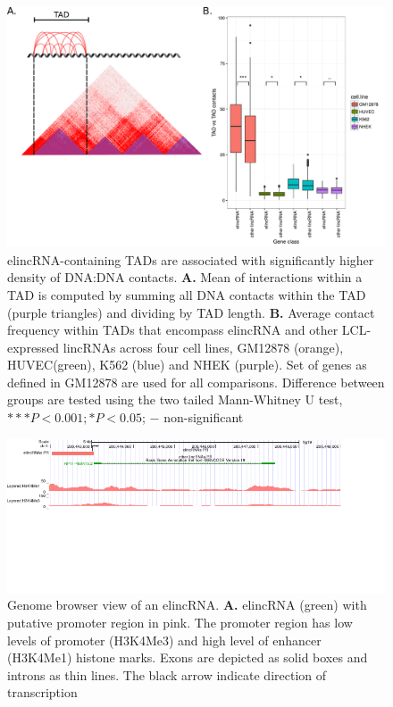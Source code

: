 \documentclass[11pt,a4paper]{report}
\begin{document}
\begin{figure}[ht]
	\includegraphics[width=1\textwidth]{Figures/5_TAD_TAD_contact.pdf}
	\caption{elincRNA-containing TADs are associated with significantly higher density of DNA:DNA contacts. \textbf{A.} Mean of interactions within a TAD is computed by summing all DNA contacts within the TAD (purple triangles) and dividing by TAD length. \textbf{B.} Average contact frequency within TADs that encompass elincRNA and other LCL-expressed lincRNAs across four cell lines, GM12878 (orange), HUVEC(green), K562 (blue) and NHEK (purple). Set of genes as defined in GM12878 are used for all comparisons. Difference between groups are tested using the two tailed Mann-Whitney U test, $***P<0.001; *P<0.05$; $-$ non-significant}
	\label{TAD_TAD_contacts}
\end{figure}

\begin{figure}[ht]
	\includegraphics[width=1\textwidth]{Figures/7_merged_examples.pdf}
	\caption{Genome browser view of an elincRNA. \textbf{A.} elincRNA (green) with putative promoter region in pink. The promoter region has low levels of promoter (H3K4Me3) and high level of enhancer (H3K4Me1) histone marks. Exons are depicted as solid boxes and introns as thin lines. The black arrow indicate direction of transcription}
	\label{Genome_browser}
\end{figure}
\end{document}

